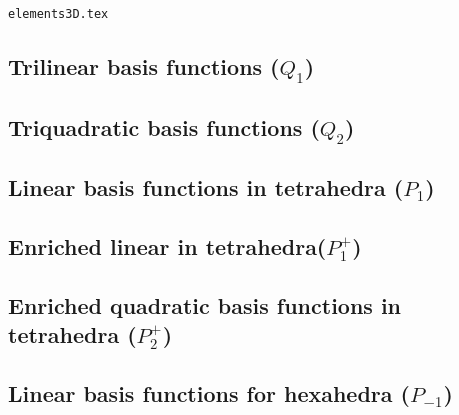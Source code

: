 \begin{flushright} {\tiny {\color{gray} \tt elements3D.tex}} \end{flushright}

\subsection{Trilinear basis functions ($Q_1$)}


\subsection{Triquadratic basis functions ($Q_2$)}


\subsection{Linear basis functions in tetrahedra ($P_1$)}


\subsection{Enriched linear in tetrahedra($P_1^+$)}


\subsection{Enriched quadratic basis functions in tetrahedra ($P_2^+$)}


\subsection{Linear basis functions for hexahedra ($P_{-1}$)} \label{ss:lbfh3D}

